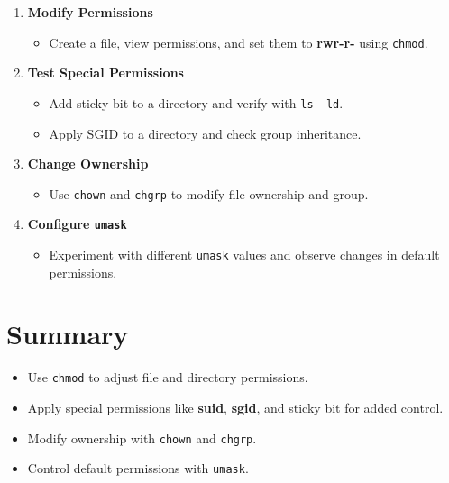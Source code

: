 \documentclass[a4paper]{report}
\begin{document}
\begin{enumerate}
    \item \textbf{Modify Permissions}
    \begin{itemize}
        \item Create a file, view permissions, and set them to \textbf{\textbf{rw\text{-}r\text{-}-r\text{-}-}
        } using \texttt{chmod}.
    \end{itemize}

    \item \textbf{Test Special Permissions}
    \begin{itemize}
        \item Add sticky bit to a directory and verify with \texttt{ls -ld}.
        \item Apply SGID to a directory and check group inheritance.
    \end{itemize}

    \item \textbf{Change Ownership}
    \begin{itemize}
        \item Use \texttt{chown} and \texttt{chgrp} to modify file ownership and group.
    \end{itemize}

    \item \textbf{Configure \texttt{umask}}
    \begin{itemize}
        \item Experiment with different \texttt{umask} values and observe changes in default permissions.
    \end{itemize}
\end{enumerate}

\section*{Summary}
\begin{itemize}
    \item Use \texttt{chmod} to adjust file and directory permissions.
    \item Apply special permissions like \textbf{suid}, \textbf{sgid}, and sticky bit for added control.
    \item Modify ownership with \texttt{chown} and \texttt{chgrp}.
    \item Control default permissions with \texttt{umask}.
\end{itemize}

\newpage
\end{document}
